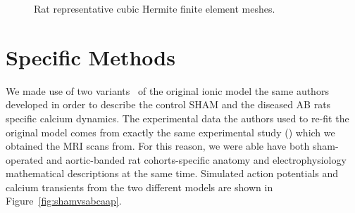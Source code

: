 \begin{figure}[!ht]
    \myfloatalign
    \quad
    \caption{Rat representative cubic Hermite finite element meshes.}
    \label{fig:ratrepgeom}
\end{figure}

%
%
%
\section{Specific Methods}
We made use of two variants~\cite{Gattoni:2017} of the original ionic model the same authors developed in order to describe the control SHAM and the diseased AB rats specific calcium dynamics. The experimental data the authors used to re-fit the original model comes from exactly the same experimental study (\cite{Roe:2017}) which we obtained the MRI scans from. For this reason, we were able have both sham-operated and aortic-banded rat cohorts-specific anatomy and electrophysiology mathematical descriptions at the same time. Simulated action potentials and calcium transients from the two different models are shown in Figure~\ref{fig:shamvsabcaap}.

